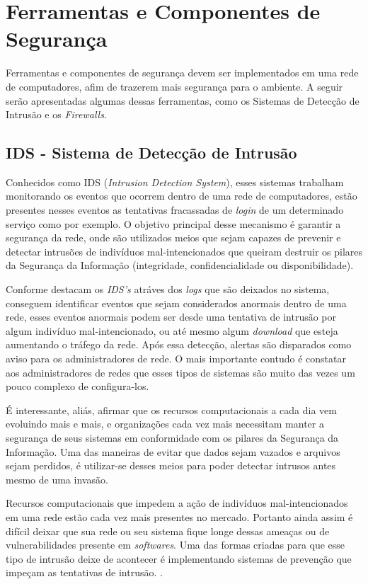 \section{Ferramentas e Componentes de Segurança}
Ferramentas e componentes de segurança devem ser implementados em uma rede de computadores, afim de trazerem mais segurança para o ambiente. A seguir serão apresentadas algumas dessas ferramentas, como os Sistemas de Detecção de Intrusão e os \textit{Firewalls}.

\subsection{IDS - Sistema de Detecção de Intrusão}
Conhecidos como IDS (\textit{Intrusion Detection System}), esses sistemas trabalham monitorando os eventos que ocorrem dentro de uma rede de computadores, estão presentes nesses eventos as tentativas fracassadas de \textit{login} de um determinado serviço como por exemplo. O objetivo principal desse mecanismo é garantir a segurança da rede, onde são utilizados meios que sejam capazes de prevenir e detectar intrusões de indivíduos mal-intencionados que queiram destruir os pilares da Segurança da Informação (integridade, confidencialidade ou disponibilidade).

Conforme destacam  os \textit{IDS's} atráves dos \textit{logs} que são deixados no sistema, conseguem identificar eventos que sejam considerados anormais dentro de uma rede, esses eventos anormais podem ser desde uma tentativa de intrusão por algum indivíduo mal-intencionado, ou até mesmo algum \textit{download} que esteja aumentando o tráfego da rede. Após essa detecção, alertas são disparados como aviso para os administradores de rede. O mais importante contudo é constatar aos administradores de redes que esses tipos de sistemas são muito das vezes um pouco complexo de configura-los.

É interessante, aliás, afirmar que os recursos computacionais a cada dia vem evoluindo mais e mais, e organizações cada vez mais necessitam manter a segurança de seus sistemas em conformidade com os pilares da Segurança da Informação. Uma das maneiras de evitar que dados sejam vazados e arquivos sejam perdidos, é utilizar-se desses meios para poder detectar intrusos antes mesmo de uma invasão. 

Recursos computacionais que impedem a ação de indivíduos mal-intencionados em uma rede estão cada vez mais presentes no mercado. Portanto ainda assim é difícil deixar que sua rede ou seu sistema fique longe dessas ameaças ou de vulnerabilidades presente em \textit{softwares}. Uma das formas criadas para que esse tipo de intrusão deixe de acontecer é implementando sistemas de prevenção que impeçam as tentativas de intrusão. \cite{marcelo2003}.

